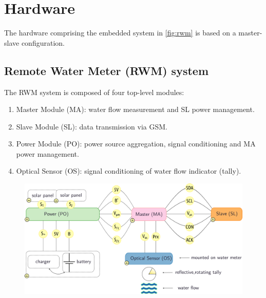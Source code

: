 \chapter{Hardware}

The hardware comprising the embedded system in \ref{fig:rwm} is based on a master-slave configuration.


\clearpage
\section{Remote Water Meter (RWM) system}

The RWM system is composed of four top-level modules:

\begin{enumerate}
    \item Master Module (MA): water flow measurement and SL power management.
    \item Slave Module (SL): data transmission via GSM.
    \item Power Module (PO): power source aggregation, signal conditioning and MA power management.
    \item Optical Sensor (OS): signal conditioning of water flow indicator (tally).
\end{enumerate}

\begin{figure}[h]
    \centering
    \includegraphics[width=1.0\textwidth]{EP}
\end{figure}


\clearpage



\clearpage

\clearpage

\clearpage

\clearpage
